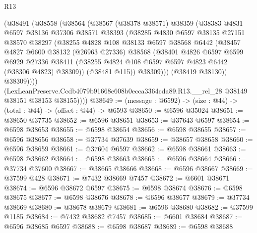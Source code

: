\begin{lexlean}{R13}
\begin{coremodule}
            (@38491
              (@38558
                (@38564
                  (@38567
                    (@38378 @38571)
                    @38359
                    (@38383
                      @4831
                      @6597
                      @38136
                      @37306
                      @38571
                      @38393
                      (@38285
                        @4830
                        @6597
                        @38135
                        @27151
                        @38570
                        @38297
                        (@38255
                          @4828
                          @108
                          @38133
                          @6597
                          @38568
                          @6442
                          (@38457
                            @4827
                            @6600
                            @38132
                            (@26963 @27336)
                            @38568
                            (@38401
                              @4826
                              @6597
                              @6599
                              @6929
                              @27336
                              @38411
                              (@38255 @4824 @108 @6597 @6597 @4823 @6442 (@38306 @4823) @38309))
                            (@38481 @115))
                          @38309)))
                    (@38419 @38130))
                  @38309))))
          (LexLeanPreserve.Ccdb4079b91668e608b0ecca3364cda89.R13.__rel_28
            @38149
            @38151
            @38153
            @38155))))
@38649 := (message : @6592) -> (size : @44) -> (total : @44) -> (offset : @44) -> @6593
@38650 := @6596 @35024
@38651 := @38650 @37735
@38652 := @6596 @38651
@38653 := @37643 @6597
@38654 := @6598 @38653
@38655 := @6598 @38654
@38656 := @6598 @38655
@38657 := @6596 @38656
@38658 := @37734 @37639
@38659 := @38657 @38658
@38660 := @6596 @38659
@38661 := @37604 @6597
@38662 := @6598 @38661
@38663 := @6598 @38662
@38664 := @6598 @38663
@38665 := @6596 @38664
@38666 := @37734 @37600
@38667 := @38665 @38666
@38668 := @6596 @38667
@38669 := @37599 @428
@38671 := @7432 @38669 @7457
@38672 := @6601 @38671
@38674 := @6596 @38672 @6597
@38675 := @6598 @38674
@38676 := @6598 @38675
@38677 := @6598 @38676
@38678 := @6596 @38677
@38679 := @37734 @38669
@38680 := @38678 @38679
@38681 := @6596 @38680
@38682 := @37599 @1185
@38684 := @7432 @38682 @7457
@38685 := @6601 @38684
@38687 := @6596 @38685 @6597
@38688 := @6598 @38687
@38689 := @6598 @38688

\end{coremodule}
\end{lexlean}
